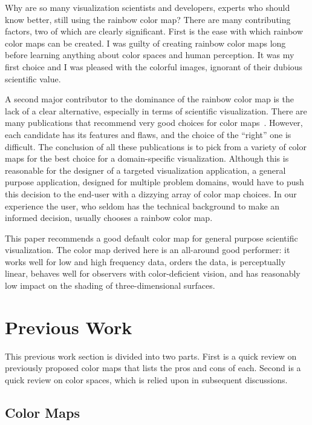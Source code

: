 \documentclass[review,journal]{vgtc}         %
\newcommand{\lcite}[1]{~\cite{#1}}
\begin{document}
Why are so many visualization scientists and developers, experts who
should know better, still using the rainbow color map?
There are many contributing factors, two of which are clearly significant.
First is the ease with which rainbow color maps
can be created.  I was guilty of creating rainbow color maps
long before learning anything about color spaces and human perception.  It
was my first choice and I was pleased with the colorful images, ignorant of
their dubious scientific value.

A second major contributor to the dominance of the rainbow color map is the
lack of a clear alternative, especially in terms of scientific
visualization.  There are many publications that recommend
very good choices for color maps\lcite{Brewer05,Levkowitz92,Rheingans99,Ware04}.
However, each candidate has its features and flaws, and the choice of
the ``right'' one is difficult.  The conclusion of
all these publications is to pick from a variety of color maps for the best
choice for a domain-specific visualization.  Although this is reasonable
for the designer of a targeted visualization application, a general
purpose application, designed for multiple problem domains, would have to
push this decision to the end-user with a dizzying array of color map
choices.  In our experience the user, who seldom has the technical
background to make an informed decision, usually chooses a rainbow color map.

This paper recommends a good default
color map for general purpose scientific visualization.  The
color map derived here is an all-around good performer: it works well for
low and high frequency data, orders the data, is perceptually linear,
behaves well for observers with color-deficient vision, and has reasonably
low impact on the shading of three-dimensional surfaces.


\section{Previous Work}
\label{sec:PreviousWork}

This previous work section is divided into two parts.  First is a
quick review on previously proposed color maps that lists the pros and
cons of each.  Second is a quick review on color spaces,
which is relied upon in subsequent discussions.

\subsection{Color Maps}
\label{sec:PreviousWork:ColorMaps}
\end{document}
